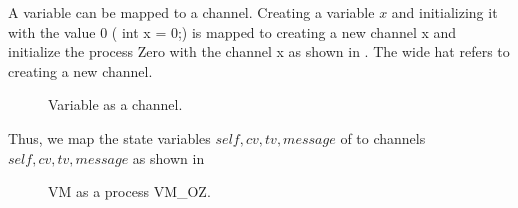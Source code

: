 A variable can be mapped to a channel. Creating a variable $x$ and initializing it with the value $0$ ( int x = 0;) is mapped to creating a new channel x and initialize the process Zero with the channel x
as shown in . The wide hat refers to creating a new channel.
\begin{figure}[H]%
\centering
{}%
\hspace{1em}%
%
\caption{Variable as a channel.}
\label{tra_var}%
\end{figure}

Thus, we map the state variables $self, cv, tv, message$ of  to \picalc{} channels $self, cv, tv, message$ as shown in 

\begin{figure}[H]
\centering
{}
\caption{VM as a \picalc{} process VM\_OZ.}
\label{tra_var2}
\end{figure}